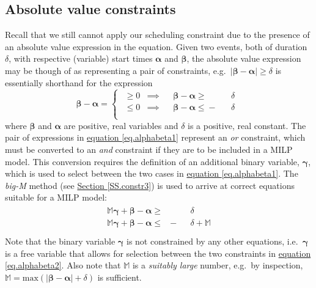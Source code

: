 \subsection{Absolute value constraints}\label{SS.absval}
Recall that we still cannot apply our scheduling constraint due to the presence
of an absolute value expression in the equation.
Given two events, both of duration $\delta$, with respective (variable) start
times $\boldsymbol{\alpha}$ and $\boldsymbol{\beta}$, the absolute
value expression may be though of as representing a pair of constraints, e.g.\ 
$ \lvert \boldsymbol{\beta} - \boldsymbol{\alpha} \rvert \ge \delta $
is essentially shorthand for the expression
\begin{equation}
    \boldsymbol{\beta} - \boldsymbol{\alpha} = 
    \begin{cases}
        \begin{alignedat}{6}
            \ge{} 0 &\implies &&\boldsymbol{\beta} {}-{} \boldsymbol{\alpha}
            {}\ge{} &&\delta\\
            \le{} 0 &\implies &&\boldsymbol{\beta} {}-{} \boldsymbol{\alpha}
            {}\le{} - &&\delta\\
        \end{alignedat}
    \end{cases}
    \label{eq.alphabeta1}
\end{equation}
where $\boldsymbol{\beta}$ and $\boldsymbol{\alpha}$ are positive, real
variables and $\delta$ is a positive, real constant.
The pair of expressions in 
\hyperref[eq.alphabeta1]{equation \ref*{eq.alphabeta1}}
represent an \emph{or} constraint, which must be converted to an \emph{and}
constraint if they are to be included in a MILP model.
This conversion requires the definition of an additional binary variable,
$\boldsymbol{\gamma}$, which is used to select between the two cases in
\hyperref[eq.alphabeta1]{equation \ref*{eq.alphabeta1}}.
The \emph{big-M} method (see \hyperref[SS.constr3]{Section \ref*{SS.constr3}})
is used to arrive at correct equations suitable for a
MILP model:
\begin{equation}
    \begin{split}
        \begin{alignedat}{4}
            \mathbb{M} \boldsymbol{\gamma} + \boldsymbol{\beta} 
            - \boldsymbol{\alpha} {}\ge{} & &&\delta\\
            \mathbb{M} \boldsymbol{\gamma} + \boldsymbol{\beta}
            - \boldsymbol{\alpha} {}\le{} & - &&\delta {}+{} \mathbb{M}\\
        \end{alignedat}
    \end{split}
    \label{eq.alphabeta2}
\end{equation}
Note that the binary variable $\boldsymbol{\gamma}$ is not constrained by any
other equations, i.e.\ $\boldsymbol{\gamma}$ is a free variable that allows for
selection between the two constraints in
\hyperref[eq.alphabeta2]{equation \ref*{eq.alphabeta2}}.
Also note that $\mathbb{M}$ is a \emph{suitably large} number, e.g.\ by 
inspection,
$\mathbb{M} =  \text{max} \left(|\boldsymbol{\beta} - \boldsymbol{\alpha}|
 + \delta \right)$ is sufficient.

